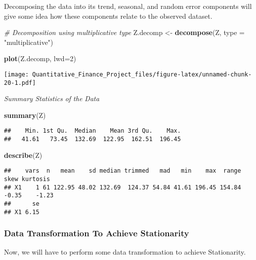 \documentclass[
]{article}
\newenvironment{Shaded}{\begin{snugshade}}{\end{snugshade}}
\newcommand{\AttributeTok}[1]{\textcolor[rgb]{0.13,0.29,0.53}{#1}}
\newcommand{\CommentTok}[1]{\textcolor[rgb]{0.56,0.35,0.01}{\textit{#1}}}
\newcommand{\DecValTok}[1]{\textcolor[rgb]{0.00,0.00,0.81}{#1}}
\newcommand{\FunctionTok}[1]{\textcolor[rgb]{0.13,0.29,0.53}{\textbf{#1}}}
\newcommand{\NormalTok}[1]{#1}
\newcommand{\OtherTok}[1]{\textcolor[rgb]{0.56,0.35,0.01}{#1}}
\newcommand{\StringTok}[1]{\textcolor[rgb]{0.31,0.60,0.02}{#1}}
\begin{document}
Decomposing the data into its trend, seasonal, and random error
components will give some idea how these components relate to the
observed dataset.

\begin{Shaded}
\begin{Highlighting}[]
\CommentTok{\# Decomposition using multiplicative type }
\NormalTok{Z.decomp }\OtherTok{\textless{}{-}} \FunctionTok{decompose}\NormalTok{(Z, }\AttributeTok{type =} \StringTok{"multiplicative"}\NormalTok{)}

\FunctionTok{plot}\NormalTok{(Z.decomp, }\AttributeTok{lwd=}\DecValTok{2}\NormalTok{)}
\end{Highlighting}
\end{Shaded}

\texttt{[image: Quantitative\_Finance\_Project\_files/figure-latex/unnamed-chunk-20-1.pdf]}

\emph{Summary Statistics of the Data}

\begin{Shaded}
\begin{Highlighting}[]
\FunctionTok{summary}\NormalTok{(Z)}
\end{Highlighting}
\end{Shaded}

\begin{verbatim}
##    Min. 1st Qu.  Median    Mean 3rd Qu.    Max. 
##   41.61   73.45  132.69  122.95  162.51  196.45
\end{verbatim}

\begin{Shaded}
\begin{Highlighting}[]
\FunctionTok{describe}\NormalTok{(Z)}
\end{Highlighting}
\end{Shaded}

\begin{verbatim}
##    vars  n   mean    sd median trimmed   mad   min    max  range  skew kurtosis
## X1    1 61 122.95 48.02 132.69  124.37 54.84 41.61 196.45 154.84 -0.35    -1.23
##      se
## X1 6.15
\end{verbatim}

\hypertarget{data-transformation-to-achieve-stationarity-2}{%
\subsubsection{Data Transformation To Achieve
Stationarity}\label{data-transformation-to-achieve-stationarity-2}}

Now, we will have to perform some data transformation to achieve
Stationarity.
\end{document}
